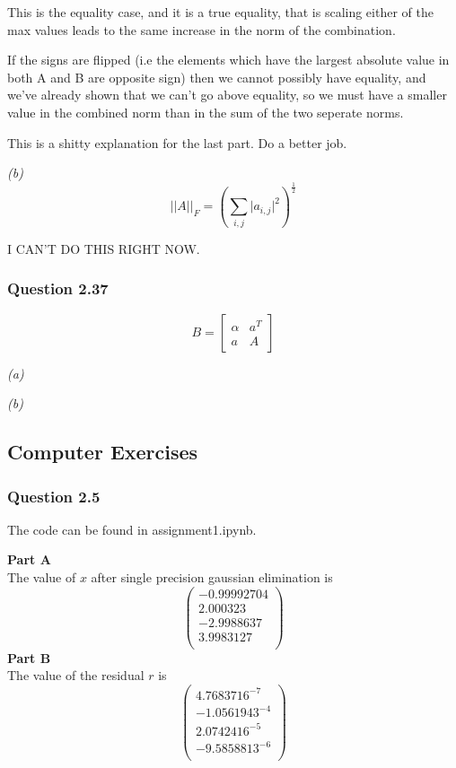 \documentclass{article}
\begin{document}
This is the equality case, and it is a true equality, that is scaling either
of the max values leads to the same increase in the norm of the combination.

If the signs are flipped (i.e the elements which have the largest absolute value in
both A and B are opposite sign) then we cannot possibly have equality, and we've
already shown that we can't go above equality, so we must have a smaller value in
the combined norm than in the sum of the two seperate norms.

{\color{red} This is a shitty explanation for the last part. Do a better job.}

\textit{(b)}
$$ \lvert \lvert A\rvert \rvert_{F} = \left( \sum_{i,j}\lvert a_{i,j} \rvert^{2} \right)^{\frac{1}{2}} $$

{\color{red} I CAN'T DO THIS RIGHT NOW.}


\subsubsection{Question 2.37}

$$B = \left[ \begin{smallmatrix} \alpha & a^{T} \\ a & A \end{smallmatrix} \right]$$
{\color{red}
\textit{(a)}

\textit{(b)}
}


\subsection{Computer Exercises}
\subsubsection{Question 2.5}
The code can be found in assignment1.ipynb.

\textbf{Part A}\\
The value of $x$ after single precision gaussian elimination is
$$\left( \begin{smallmatrix}-0.99992704\\
 2.000323\\
 -2.9988637\\
 3.9983127\\
 \end{smallmatrix}
 \right)
$$
\textbf{Part B}\\
The value of the residual $r$ is
$$\left( \begin{smallmatrix}4.7683716^{-7}\\
 -1.0561943^{-4}\\
 2.0742416^{-5}\\
 -9.5858813^{-6}\\
 \end{smallmatrix}
 \right)
$$
\end{document}
